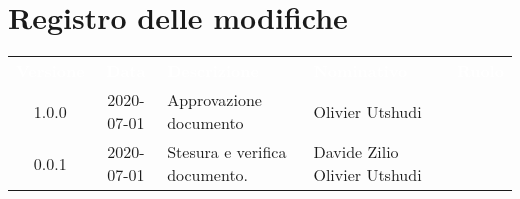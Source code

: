 \section*{Registro delle modifiche}
{
	\centering
	\begin{longtable}{ c c C{4cm}  C{4cm}  C{3cm} }
		\textcolor{white}{\textbf{Versione}} & \textcolor{white}{\textbf{Data}} & \textcolor{white}{\textbf{Descrizione}} & \textcolor{white}{\textbf{Nominativo}} & \textcolor{white}{\textbf{Ruolo}}\\		
		1.0.0 & 2020-07-01 & Approvazione documento & Olivier Utshudi &\RdP{}\\		
		0.0.1 & 2020-07-01 & Stesura e verifica documento. & Davide Zilio \newline Olivier Utshudi &\reda{} \newline \ver{} \\		
		
	\end{longtable}

}